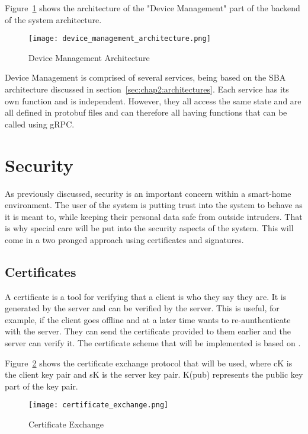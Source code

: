 Figure~\ref{fig:device_management_architecture} shows the architecture of the "Device Management" part of the backend of the system architecture.
\begin{figure}[h]
\caption{Device Management Architecture}
\centering
\texttt{[image: device\_management\_architecture.png]}
\label{fig:device_management_architecture}
\end{figure}
Device Management is comprised of several services, being based on the SBA architecture discussed in section~\ref{sec:chap2:architectures}. Each service has its own function and is independent. However, they all access the same state and are all defined in protobuf files and can therefore all having functions that can be called using gRPC.


\section{Security} \label{sec:chapdesign:security}
As previously discussed, security is an important concern within a smart-home environment. The user of the system is putting trust into the system to behave as it is meant to, while keeping their personal data safe from outside intruders. That is why special care will be put into the security aspects of the system. This will come in a two pronged approach using certificates and signatures. 
\subsection{Certificates}
A certificate is a tool for verifying that a client is who they say they are. It is generated by the server and can be verified by the server. This is useful, for example, if the client goes offline and at a later time wants to re-aunthenticate with the server. They can send the certificate provided to them earlier and the server can verify it. The certificate scheme that will be implemented is based on \cite{disSysConceptsDesign}.

Figure~\ref{fig:certificate_exchange} shows the certificate exchange protocol that will be used, where cK is the client key pair and sK is the server key pair. K(pub) represents the public key part of the key pair.
\begin{figure}[h]
\caption{Certificate Exchange}
\texttt{[image: certificate\_exchange.png]}
\label{fig:certificate_exchange}
\end{figure}

